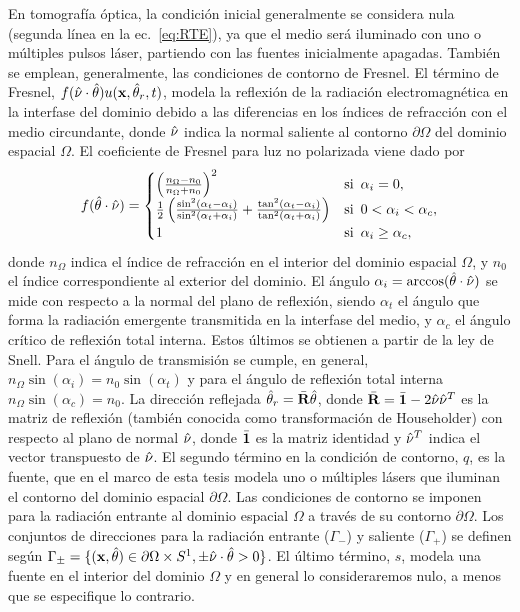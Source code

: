En tomografía óptica, la condición inicial generalmente se considera nula 
(segunda línea en la ec.~\eqref{eq:RTE}), ya 
que el medio será iluminado con uno o múltiples pulsos láser, partiendo con las 
fuentes inicialmente apagadas. 
También se emplean, generalmente, las condiciones de contorno de Fresnel. 
El término de Fresnel, $f(\hat{\nu} \cdot \hat{\theta}) u(\mathbf{x},\hat{\theta}_r,t)$, 
modela la reflexión de la radiación electromagnética 
en la interfase del dominio  debido a las diferencias en los índices de refracción 
con el medio circundante, 
donde $\hat{\nu}$ indica la normal saliente al contorno $\partial \Omega$ del dominio espacial 
$\Omega$. 
El coeficiente de Fresnel para luz no polarizada viene dado por~\cite{Born1999}
\begin{equation}
f(\hat{\theta} \cdot \hat{\nu}) =
     \begin{cases}
      \left( \frac{n_{\Omega}-n_0}{n_{\Omega}+n_0} \right)^2  & \text{si~} \, \alpha_i = 0, \\
       \frac{1}{2}\left(\frac{\sin^2(\alpha_t-\alpha_i)}{\sin^2(\alpha_t+
       \alpha_i)}+\frac{\tan^2(\alpha_t-\alpha_i)}{\tan^2(\alpha_t+\alpha_i)}\right) & 
       \text{si~} \, 0<\alpha_i < \alpha_c, \\
      1  & \text{si~} \, \alpha_i \ge \alpha_c, \\
     \end{cases}
     \label{eq:Fresnel}
\end{equation}
donde $n_\Omega$ indica  el índice de refracción en el interior 
del dominio espacial $\Omega$, y $n_0$ el índice correspondiente al exterior del dominio. El ángulo $\alpha_i=\arccos(\hat{\theta} \cdot \hat{\nu})$ 
se mide con respecto a la normal del plano de reflexión, siendo $\alpha_t$ 
el ángulo que forma la radiación emergente transmitida en la interfase del medio, y $\alpha_c$ el ángulo 
crítico de reflexión total interna. Estos últimos se obtienen a partir de la ley de Snell. 
Para el ángulo de transmisión se cumple, en general, $n_{\Omega} \sin(\alpha_i)=n_0 \sin (\alpha_t)$ y para el  
ángulo de reflexión total interna $n_{\Omega} \sin(\alpha_c)=n_0$.
La dirección reflejada $\hat{\theta}_r=\bar{\mathbf{R}} \hat{\theta}$, donde $\bar{\mathbf{R}} =\bar{\mathbf{1}}-2\hat{\nu} \hat{\nu}^T$ es la matriz de reflexión 
(también conocida como transformación de Householder) con respecto al plano de normal $\hat{\nu}$, donde $\bar{\mathbf{1}}$ 
es la matriz identidad y $\hat{\nu}^T$ 
indica el vector transpuesto de $\hat{\nu}$.   El 
segundo término en la condición de contorno, $q$, es la fuente, que en el marco de esta tesis 
modela uno o múltiples lásers que iluminan el contorno del dominio espacial $\partial \Omega$. 
Las condiciones de contorno se imponen para la radiación entrante 
al dominio espacial $\Omega$ a través de su contorno $\partial \Omega$. 
Los conjuntos de direcciones para la radiación entrante ($\Gamma_-$) y saliente ($\Gamma_+$) 
se definen según $\Gamma_{\pm}=\{(\mathbf{x},\hat{\theta}) \in \partial \Omega \times S^1, 
\pm \hat \nu \cdot \hat{\theta} >0 \}$. 
El último término, $s$, modela una fuente en el interior 
del dominio $\Omega$ y en general lo consideraremos nulo, a menos 
que se especifique lo contrario. 

